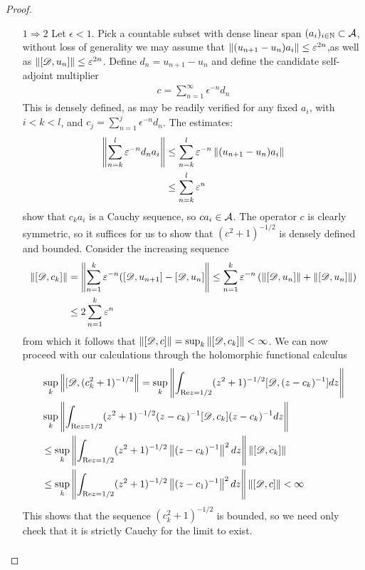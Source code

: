 \begin{proof} 
\begin{itemize}
	\item[$1\Rightarrow 2$]
		Let $\epsilon<1$. Pick a countable subset with dense linear span $(a_i)_{i\in \mathbb{N}}\subset \mathcal{A}$, without loss of generality we may assume that $\left \Vert (u_{n+1}-u_n)a_i \right \Vert\leq \varepsilon^{2n}$,as well as $\left \Vert [\mathscr{D},u_n] \right \Vert\leq \varepsilon^{2n}$. Define $d_n=u_{n+1}-u_n$ and define the candidate self-adjoint multiplier 
		\begin{align*}
			c=\sum_{n=1}^\infty \epsilon^{-n}d_n
		\end{align*}
		This is densely defined, as may be readily verified for any fixed $a_i$, with $i<k<l$, and $c_j=\sum_{n=1}^j \epsilon^{-n}d_n$. The estimates: 
		\begin{align*}
			\left \Vert \sum_{n=k}^l \varepsilon^{-n}d_na_i \right \Vert&\leq \sum_{n=k}^l \varepsilon^{-n}\left \Vert (u_{n+1}-u_n)a_i \right \Vert \\
			&\leq \sum_{n=k}^l \varepsilon^n
		\end{align*}
		show that $c_k a_i$ is a Cauchy sequence, so $ca_i\in \mathcal{A}$. The operator $c$ is clearly symmetric, so it suffices for us to show that $(c^2+1)^{-1/2}$ is densely defined and bounded. Consider the increasing sequence 
		\begin{align*}
			\left \Vert [\mathscr{D},c_k] \right \Vert&=\left \Vert \sum_{n=1}^k \varepsilon^{-n}([\mathscr{D},u_{n+1}]-[\mathscr{D},u_n] \right \Vert\leq \sum_{n=1}^k \varepsilon^{-n} \left ( \left \Vert [\mathscr{D},u_n] \right \Vert+\left \Vert [\mathscr{D},u_n] \right \Vert \right ) \\
			&\leq 2\sum_{n=1}^k \varepsilon^{n}
		\end{align*}
		from which it follows that $\left \Vert [\mathscr{D},c] \right \Vert=\sup_k\left \Vert [\mathscr{D},c_k] \right \Vert<\infty$. We can now proceed with our calculations through the holomorphic functional calculus
		\begin{align*}
			&\sup_k \left \Vert [\mathscr{D},(c_k^2+1)^{-1/2} \right \Vert=\sup_{k}\left \Vert \int_{\text{Re}{z}=1/2} (z^2+1)^{-1/2} [\mathscr{D},(z-c_k)^{-1}] dz \right \Vert \\ 
			&\sup_{k}\left \Vert \int_{\text{Re}{z}=1/2} (z^2+1)^{-1/2} (z-c_k)^{-1} [\mathscr{D},c_k](z-c_k)^{-1} dz \right \Vert \\
			&\leq \sup_{k}\left \Vert \int_{\text{Re}{z}=1/2} (z^2+1)^{-1/2} \left \Vert (z-c_k)^{-1} \right \Vert^2 dz \right \Vert \left \Vert [\mathscr{D},c_k] \right \Vert \\
			&\leq \sup_{k}\left \Vert \int_{\text{Re}{z}=1/2} (z^2+1)^{-1/2} \left \Vert (z-c_1)^{-1} \right \Vert^2 dz \right \Vert \left \Vert [\mathscr{D},c] \right \Vert<\infty
		\end{align*}
		This shows that the sequence $(c_k^2+1)^{-1/2}$ is  bounded, so we need only check that it is strictly Cauchy for the limit to exist. 
		\begin{align*}

\end{align*}
\end{itemize}
\end{proof}

